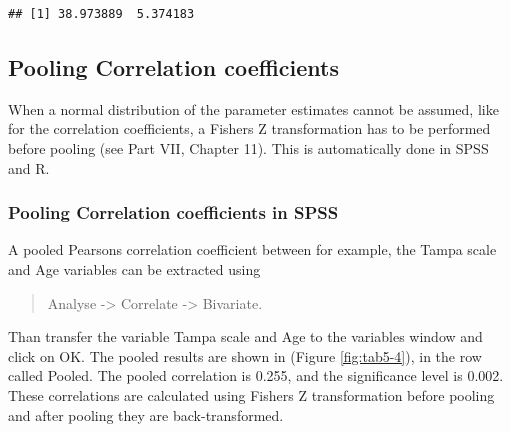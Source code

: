 \documentclass[]{book}
\begin{document}
\begin{verbatim}
## [1] 38.973889  5.374183
\end{verbatim}

\subsection{Pooling Correlation
coefficients}\label{pooling-correlation-coefficients}

When a normal distribution of the parameter estimates cannot be assumed,
like for the correlation coefficients, a Fishers Z transformation has to
be performed before pooling (see Part VII, Chapter 11). This is
automatically done in SPSS and R.

\subsubsection{Pooling Correlation coefficients in
SPSS}\label{pooling-correlation-coefficients-in-spss}

A pooled Pearsons correlation coefficient between for example, the Tampa
scale and Age variables can be extracted using

\begin{quote}
Analyse -\textgreater{} Correlate -\textgreater{} Bivariate.
\end{quote}

Than transfer the variable Tampa scale and Age to the variables window
and click on OK. The pooled results are shown in (Figure
\ref{fig:tab5-4}), in the row called Pooled. The pooled correlation is
0.255, and the significance level is 0.002. These correlations are
calculated using Fishers Z transformation before pooling and after
pooling they are back-transformed.
\end{document}
